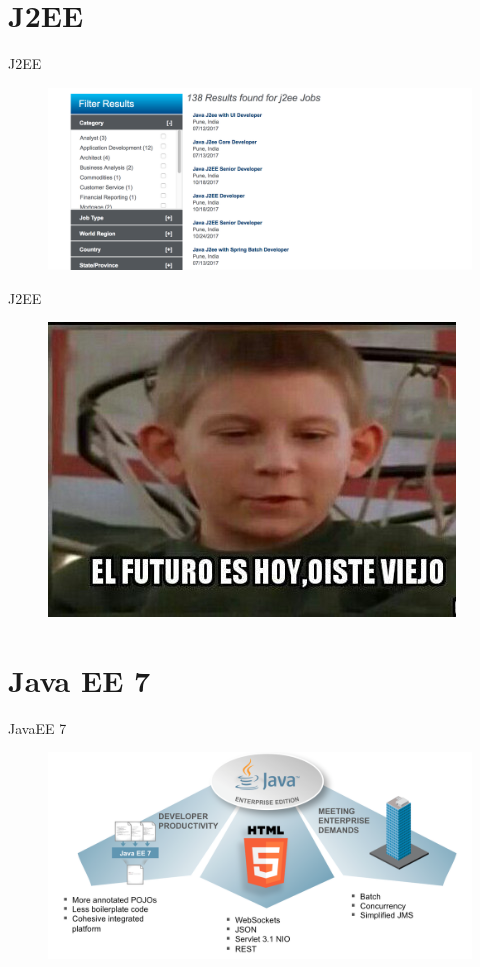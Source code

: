 \documentclass{beamer}
\begin{document}
\section{J2EE}

\begin{frame}{J2EE}
\begin{figure}
	\centering
	\includegraphics[width=\linewidth]{Images/jobs}
\end{figure}
\end{frame}

\begin{frame}{J2EE}
\begin{figure}
	\centering
	\includegraphics[width=0.6\linewidth]{Images/futuro}
\end{figure}
\end{frame}

\section{Java EE 7}

\begin{frame}{JavaEE 7}
\begin{figure}
	\centering
	\includegraphics[width=0.75\linewidth]{Images/javaee7-theme}
\end{figure}
\end{frame}
\end{document}
